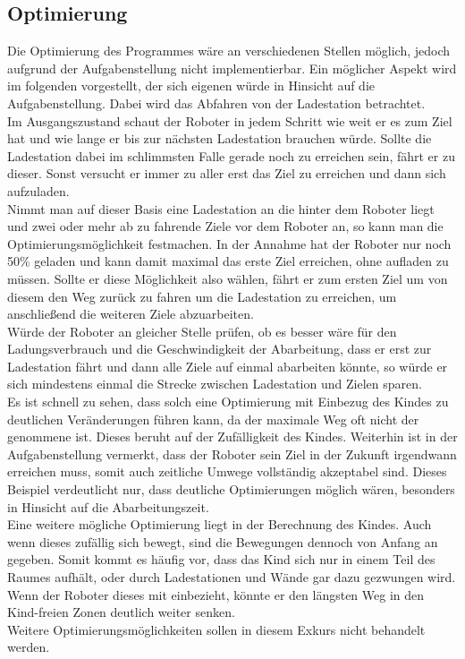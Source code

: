 \subsection{Optimierung}
Die Optimierung des Programmes wäre an verschiedenen Stellen möglich, jedoch aufgrund der Aufgabenstellung nicht implementierbar. Ein möglicher Aspekt wird im folgenden vorgestellt, der sich eigenen würde in Hinsicht auf die Aufgabenstellung. Dabei wird das Abfahren von der Ladestation betrachtet. \\
Im Ausgangszustand schaut der Roboter in jedem Schritt wie weit er es zum Ziel hat und wie lange er bis zur nächsten Ladestation brauchen würde. Sollte die Ladestation dabei im schlimmsten Falle gerade noch zu erreichen sein, fährt er zu dieser. Sonst versucht er immer zu aller erst das Ziel zu erreichen und dann sich aufzuladen. \\
Nimmt man auf dieser Basis eine Ladestation an die hinter dem Roboter liegt und zwei oder mehr ab zu fahrende Ziele vor dem Roboter an, so kann man die Optimierungsmöglichkeit festmachen. In der Annahme hat der Roboter nur noch 50\% geladen und kann damit maximal das erste Ziel erreichen, ohne aufladen zu müssen. Sollte er diese Möglichkeit also wählen, fährt er zum ersten Ziel um von diesem den Weg zurück zu fahren um die Ladestation zu erreichen, um anschließend die weiteren Ziele abzuarbeiten. \\
Würde der Roboter an gleicher Stelle prüfen, ob es besser wäre für den Ladungsverbrauch und die Geschwindigkeit der Abarbeitung, dass er erst zur Ladestation fährt und dann alle Ziele auf einmal abarbeiten könnte, so würde er sich mindestens einmal die Strecke zwischen Ladestation und Zielen sparen. \\
Es ist schnell zu sehen, dass solch eine Optimierung mit Einbezug des Kindes zu deutlichen Veränderungen führen kann, da der maximale Weg oft nicht der genommene ist. Dieses beruht auf der Zufälligkeit des Kindes. Weiterhin ist in der Aufgabenstellung vermerkt, dass der Roboter sein Ziel in der Zukunft irgendwann erreichen muss, somit auch zeitliche Umwege vollständig akzeptabel sind. Dieses Beispiel verdeutlicht nur, dass deutliche Optimierungen möglich wären, besonders in Hinsicht auf die Abarbeitungszeit. \\
Eine weitere mögliche Optimierung liegt in der Berechnung des Kindes. Auch wenn dieses zufällig sich bewegt, sind die Bewegungen dennoch von Anfang an gegeben. Somit kommt es häufig vor, dass das Kind sich nur in einem Teil des Raumes aufhält, oder durch Ladestationen und Wände gar dazu gezwungen wird. Wenn der Roboter dieses mit einbezieht, könnte er den längsten Weg in den Kind-freien Zonen deutlich weiter senken. \\
Weitere Optimierungsmöglichkeiten sollen in diesem Exkurs nicht behandelt werden.


